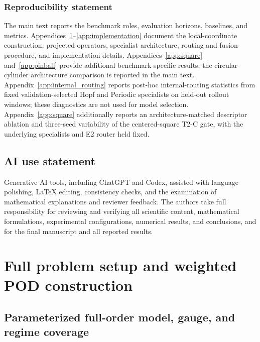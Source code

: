 \documentclass{article}
\begin{document}
\subsubsection*{Reproducibility statement}
The main text reports the benchmark roles, evaluation horizons, baselines, and metrics. Appendices~\ref{app:problem_pod}--\ref{app:implementation} document the local-coordinate construction, projected operators, specialist architecture, routing and fusion procedure, and implementation details. Appendices~\ref{app:square} and~\ref{app:pinball} provide additional benchmark-specific results; the circular-cylinder architecture comparison is reported in the main text.
Appendix~\ref{app:internal_routing} reports post-hoc internal-routing statistics
from fixed validation-selected Hopf and Periodic specialists on held-out
rollout windows; these diagnostics are not used for model selection.
Appendix~\ref{app:square} additionally reports an architecture-matched descriptor
ablation and three-seed variability of the centered-square T2-C gate, with the
underlying specialists and E2 router held fixed.

\subsection*{AI use statement}
Generative AI tools, including ChatGPT and Codex, assisted with language polishing, LaTeX editing, consistency checks, and the examination of mathematical explanations and reviewer feedback. The authors take full responsibility for reviewing and verifying all scientific
content, mathematical formulations, experimental configurations, numerical
results, and conclusions, and for the final manuscript and all reported results.




\appendix
\section{Full problem setup and weighted POD construction}
\label{app:problem_pod}

\subsection{Parameterized full-order model, gauge, and regime coverage}
\end{document}
